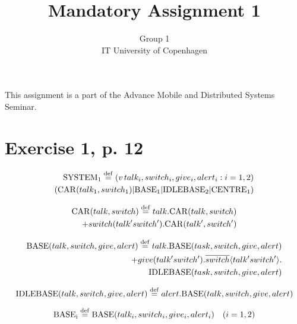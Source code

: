 \documentclass[11pt]{article}
\begin{document}
\title{Mandatory Assignment 1}
\author{Group 1\\
IT University of Copenhagen}
\renewcommand{\today}{September 22, 2012}
\maketitle
This assignment is a part of the Advance Mobile and Distributed Systems Seminar.

\section {Exercise 1, p. 12}

\begin{equation}
\begin{split}
{\rm SYSTEM_1} \stackrel{\mathrm{def}}{=} (v\,talk_i , switch_i , give_i , alert_i : i = 1,2) \\
({\rm CAR}(talk_1 , switch_1) | {\rm BASE_1} | {\rm IDLEBASE_2} | {\rm CENTRE_1})
\end{split}
\end{equation}

\begin{equation}
\begin{split}
{\rm CAR}(talk, switch) \stackrel{\rm def}{=} talk . {\rm CAR}(talk, switch) \\
+ switch(talk' switch') . {\rm CAR}(talk', switch')\\
\end{split}
\end{equation}

\begin{equation}
\begin{split}
{\rm BASE}(talk, switch, give, alert) \stackrel{\rm def}{=} talk . {\rm BASE}(task, switch, give, alert) \\
+ give(talk' switch') . \overline{switch} \langle talk' switch' \rangle . \\
{\rm IDLEBASE}(task, switch, give, alert)
\end{split}
\end{equation}

\begin{equation}
{\rm IDLEBASE}(talk, switch, give, alert) \stackrel{\mathrm{def}}{=} alert.{\rm BASE}(talk,switch,give,alert)
\end{equation}

\begin{equation}
{\rm BASE_i} \stackrel{\mathrm{def}}{=} {\rm BASE}(talk_i , switch_i , give_i , alert_i) \quad (i=1,2)
\end{equation}
\end{document}
